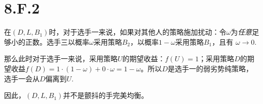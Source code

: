 \documentclass[11pt,fleqn]{article}
\begin{document}
\section*{8.F.2}
	在$(D,L,B_1) $时，对于选手一来说，如果对其他人的策略施加扰动：令$\omega $为\emph{任意}足够小的正数。选手三以概率$\omega $采用策略$B_2$，以概率$1-\omega$采用策略$B_1$，且有 $\omega \rightarrow 0$.

	那么此时对于选手一来说，采用策略$U$的期望收益：$f(U)=1$；采用策略$D$的期望收益$f(D)=1\cdot (1-\omega)+0\cdot \omega = 1-\omega$。所以$D$是选手一的弱劣势纯策略，选手一会从$D$偏离到$U$.

	因此，$(D,L,B_1)$并不是颤抖的手完美均衡。
\end{document}
